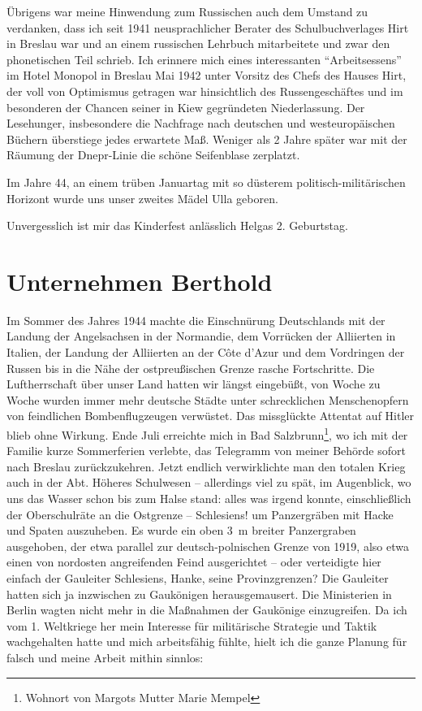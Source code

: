 \documentclass[a5paper,pagesize,10pt,twoside=true]{scrbook}
\renewcommand{\marginpar}[2][]{}
\begin{document}
Übrigens war meine Hinwendung zum Russischen auch dem Umstand zu verdanken, dass ich seit 1941 neusprachlicher Berater des Schulbuchverlages Hirt in Breslau war und an einem russischen Lehrbuch mitarbeitete und zwar den phonetischen Teil schrieb. Ich erinnere mich eines interessanten \enquote{Arbeitsessens} im Hotel Monopol in Breslau Mai 1942 unter Vorsitz des Chefs des Hauses Hirt, der voll von Optimismus getragen war hinsichtlich des Russengeschäftes und im besonderen der Chancen seiner in Kiew gegründeten Niederlassung. Der Lesehunger, insbesondere die Nachfrage nach deutschen und westeuropäischen Büchern überstiege jedes erwartete Maß. Weniger als 2 Jahre später war mit der Räumung der Dnepr-Linie die schöne Seifenblase zerplatzt.

Im Jahre 44, an einem trüben Januartag mit so düsterem politisch-militäri\-schen Horizont wurde uns unser zweites Mädel Ulla geboren.

Unvergesslich ist mir das Kinderfest anlässlich Helgas 2. Geburtstag.

\section{Unternehmen Berthold}

Im Sommer des Jahres 1944 machte die Einschnürung Deutschlands mit der Landung der Angelsachsen in der Normandie, dem Vorrücken der Alliierten in Italien, der Landung der Alliierten an der Côte d'Azur und dem Vordringen der Russen bis in die Nähe der \marginpar{42} ostpreußischen Grenze rasche Fortschritte. Die Luftherrschaft über unser Land hatten wir längst eingebüßt, von Woche zu Woche wurden immer mehr deutsche Städte unter schrecklichen Menschenopfern von feindlichen Bombenflugzeugen verwüstet. Das missglückte Attentat auf Hitler blieb ohne Wirkung. Ende Juli erreichte mich in Bad Salzbrunn\footnote{Wohnort von Margots Mutter Marie Mempel}, wo ich mit der Familie kurze Sommerferien verlebte, das Telegramm von meiner Behörde sofort nach Breslau zurückzukehren. Jetzt endlich verwirklichte man den totalen Krieg auch in der Abt. Höheres Schulwesen -- allerdings viel zu spät, im Augenblick, wo uns das Wasser schon bis zum Halse stand: alles was irgend konnte, einschließlich der Oberschulräte an die Ostgrenze -- Schlesiens! um Panzergräben mit Hacke und Spaten auszuheben. Es wurde ein oben 3~m breiter Panzergraben ausgehoben, der etwa parallel zur deutsch-polnischen Grenze von 1919, also etwa einen von nordosten angreifenden Feind ausgerichtet -- oder verteidigte hier einfach der Gauleiter Schlesiens, Hanke, seine Provinzgrenzen? Die Gauleiter hatten sich ja inzwischen zu Gaukönigen herausgemausert. Die Ministerien in Berlin wagten nicht mehr in die Maßnahmen der Gaukönige einzugreifen. Da ich vom 1. Weltkriege her mein Interesse für militärische Strategie und Taktik wachgehalten hatte und mich arbeitsfähig fühlte, hielt ich die ganze Planung für falsch und meine Arbeit mithin sinnlos:
\end{document}
